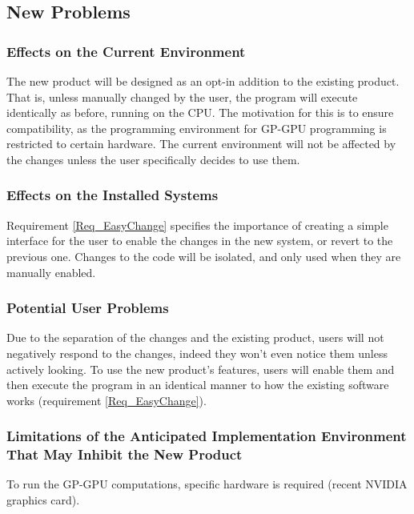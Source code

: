 \documentclass[12pt]{article}
\begin{document}
\subsection{New Problems} %
\subsubsection{Effects on the Current Environment}
The new product will be designed as an opt-in addition to the existing product. That is, unless manually changed by the user, the program will execute identically as before, running on the CPU. The motivation for this is to ensure compatibility, as the programming environment for GP-GPU programming is restricted to certain hardware. The current environment will not be affected by the changes unless the user specifically decides to use them.

\subsubsection{Effects on the Installed Systems}
Requirement \ref{Req_EasyChange} specifies the importance of creating a simple interface for the user to enable the changes in the new system, or revert to the previous one. Changes to the code will be isolated, and only used when they are manually enabled.

\subsubsection{Potential User Problems}
Due to the separation of the changes and the existing product, users will not negatively respond to the changes, indeed they won't even notice them unless actively looking. To use the new product's features, users will enable them and then execute the program in an identical manner to how the existing software works (requirement \ref{Req_EasyChange}).

\subsubsection{Limitations of the Anticipated Implementation Environment That May Inhibit the New Product}
To run the GP-GPU computations, specific hardware is required (recent NVIDIA graphics card).
\end{document}
